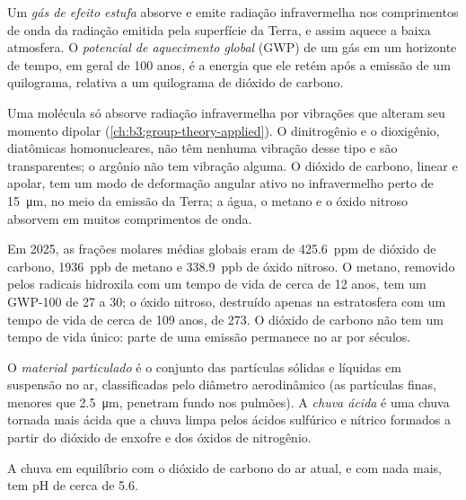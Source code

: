 \begin{definition}\label{def:b3:environmental-toxicology:greenhouse}
Um \emph{gás de efeito estufa} absorve e emite radiação
infravermelha nos comprimentos de onda da radiação emitida pela superfície da Terra, e
assim aquece a baixa atmosfera. O \emph{potencial de aquecimento
global} (GWP) de um gás em um horizonte de tempo,
em geral de 100 anos, é a energia que ele retém após a emissão de um quilograma,
relativa a um quilograma de dióxido de carbono.
\end{definition}

Uma molécula só absorve radiação infravermelha por vibrações que alteram seu
momento dipolar (\cref{ch:b3:group-theory-applied}). O dinitrogênio e o dioxigênio,
diatômicas homonucleares, não têm nenhuma vibração desse tipo e são transparentes; o argônio não tem
vibração alguma. O dióxido de carbono, linear e apolar, tem um modo de deformação angular
ativo no infravermelho perto de \qty{15}{\micro\metre}, no meio da emissão da Terra; a água, o metano
e o óxido nitroso absorvem em muitos comprimentos de onda.

Em 2025, as frações molares médias globais eram de \qty{425.6}{ppm} de dióxido de carbono, \qty{1936}{ppb} de
metano e \qty{338.9}{ppb} de óxido nitroso. O metano, removido pelos radicais hidroxila com um
tempo de vida de cerca de 12 anos, tem um GWP-100 de 27 a 30; o óxido nitroso, destruído apenas na
estratosfera com um tempo de vida de cerca de 109 anos, de 273. O dióxido de carbono não tem
um tempo de vida único: parte de uma emissão permanece no ar por séculos.

\begin{definition}[Poluentes do ar]\label{def:b3:environmental-toxicology:pollutants}
O \emph{material particulado} é o conjunto das partículas sólidas e
líquidas em suspensão no ar, classificadas pelo diâmetro aerodinâmico (as partículas finas,
menores que \qty{2.5}{\micro\metre}, penetram fundo nos pulmões). A \emph{chuva
ácida} é uma chuva tornada mais ácida que a chuva limpa pelos ácidos sulfúrico e
nítrico formados a partir do dióxido de enxofre e dos óxidos de nitrogênio.
\end{definition}

\begin{proposition}\label{prop:b3:environmental-toxicology:rain-ph}
A chuva em equilíbrio com o dióxido de carbono do ar atual, e com nada
mais, tem pH de cerca de 5.6.
\end{proposition}

